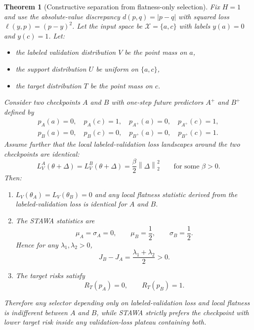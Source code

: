 \documentclass{article}
\newtheorem{theorem}{Theorem}
\newcommand{\stawa}{\textup{\textsc{STAWA}}}
\newcommand{\norm}[1]{\left\lVert #1 \right\rVert}
\begin{document}
\begin{theorem}[Constructive separation from flatness-only selection]
\label{thm:separation}
Fix $H=1$ and use the absolute-value discrepancy $d(p,q)=|p-q|$ with squared loss $\ell(y,p)=(p-y)^2$. Let the input space be $\mathcal{X}=\{a,c\}$ with labels $y(a)=0$ and $y(c)=1$. Let:
\begin{itemize}[leftmargin=1.4em]
    \item the labeled validation distribution $V$ be the point mass on $a$,
    \item the support distribution $U$ be uniform on $\{a,c\}$,
    \item the target distribution $T$ be the point mass on $c$.
\end{itemize}
Consider two checkpoints $A$ and $B$ with one-step future predictors $A^+$ and $B^+$ defined by
\begin{align}
    p_A(a)=0,\quad p_A(c)=1,\quad p_{A^+}(a)=0,\quad p_{A^+}(c)=1,\\
    p_B(a)=0,\quad p_B(c)=0,\quad p_{B^+}(a)=0,\quad p_{B^+}(c)=1.
\end{align}
Assume further that the local labeled-validation loss landscapes around the two checkpoints are identical:
\begin{equation}
    L_V^A(\theta+\Delta)
    =
    L_V^B(\theta+\Delta)
    =
    \frac{\beta}{2}\norm{\Delta}_2^2
    \qquad
    \text{for some } \beta>0.
\end{equation}
Then:
\begin{enumerate}[label=(\roman*), leftmargin=1.5em]
    \item $L_V(\theta_A)=L_V(\theta_B)=0$ and any local flatness statistic derived from the labeled-validation loss is identical for $A$ and $B$.
    \item The \stawa{} statistics are
    \begin{equation}
        \mu_A=\sigma_A=0,
        \qquad
        \mu_B=\frac{1}{2},
        \qquad
        \sigma_B=\frac{1}{2}.
    \end{equation}
    Hence for any $\lambda_1,\lambda_2>0$,
    \begin{equation}
        J_B - J_A = \frac{\lambda_1+\lambda_2}{2} > 0.
        \label{eq:score_gap}
    \end{equation}
    \item The target risks satisfy
    \begin{equation}
        R_T(p_A)=0,
        \qquad
        R_T(p_B)=1.
    \end{equation}
\end{enumerate}
Therefore any selector depending only on labeled-validation loss and local flatness is indifferent between $A$ and $B$, while \stawa{} strictly prefers the checkpoint with lower target risk inside any validation-loss plateau containing both.
\end{theorem}
\end{document}
